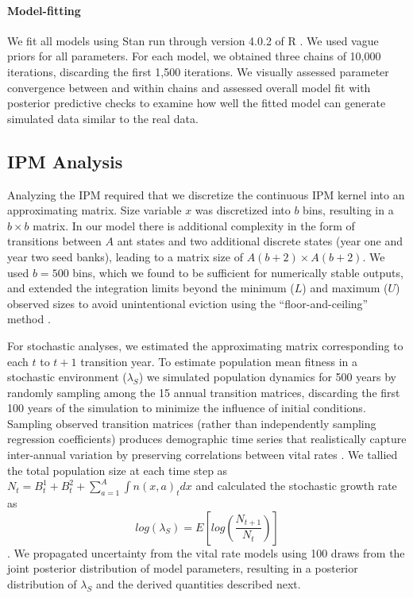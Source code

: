\documentclass[11pt]{article}
\begin{document}
\paragraph{Model-fitting}
We fit all models using Stan run through version 4.0.2 of R \citep{Rcite,Rstancite}. 
We used vague priors for all parameters. 
For each model, we obtained three chains of 10,000 iterations, discarding the first 1,500 iterations. 
We visually assessed parameter convergence between and within chains and assessed overall model fit with posterior predictive checks to examine how well the fitted model can generate simulated data similar to the real data.

\subsection*{IPM Analysis}
Analyzing the IPM required that we discretize the continuous IPM kernel into an approximating matrix. 
Size variable $x$ was discretized into $b$ bins, resulting in a $b \times b$ matrix.
In our model there is additional complexity in the form of transitions between $A$ ant states and two additional discrete states (year one and year two seed banks), leading to a matrix size of $A(b+2) \times A(b+2)$.
We used $b = 500$ bins, which we found to be sufficient for numerically stable outputs, and extended the integration limits beyond the minimum ($L$) and maximum ($U$) observed sizes to avoid unintentional eviction using the ``floor-and-ceiling'' method \citep{Williams2012}. 

For stochastic analyses, we estimated the approximating matrix corresponding to each $t$ to $t+1$ transition year. 
To estimate population mean fitness in a stochastic environment ($\lambda_{S}$) we simulated population dynamics for 500 years by randomly sampling among the 15 annual transition matrices, discarding the first 100 years of the simulation to minimize the influence of initial conditions. 
Sampling observed transition matrices (rather than independently sampling regression coefficients) produces demographic time series that realistically capture inter-annual variation by preserving correlations between vital rates \citep{metcalf2015statistical}.
We tallied the total population size at each time step as  $N_{t} = B^1_{t} + B^2_{t} + \sum_{a=1}^{A}\int n(x,a)_{t}dx$ and calculated the stochastic growth rate as 
$$log(\lambda_S) = E[log(\frac{N_{t+1}}{N_{t}})]$$ \citep{Rees2009}.
We propagated uncertainty from the vital rate models using 100 draws from the joint posterior distribution of model parameters, resulting in a posterior distribution of $\lambda_{S}$ and the derived quantities described next.
\end{document}
